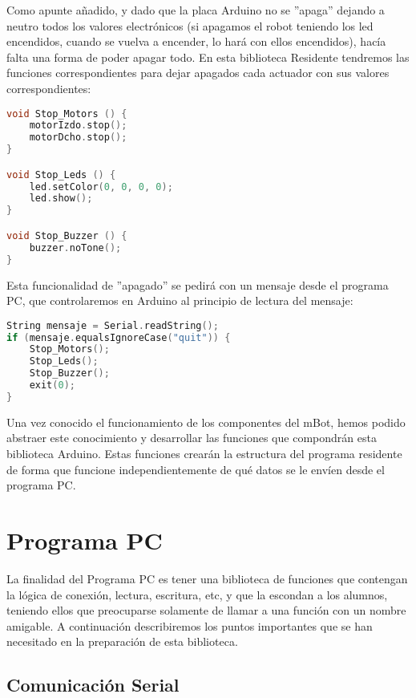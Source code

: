 \par Como apunte añadido, y dado que la placa Arduino no se ''apaga'' dejando a neutro todos los valores electrónicos (si apagamos el robot teniendo los led encendidos, cuando se vuelva a encender, lo hará con ellos encendidos), hacía falta una forma de poder apagar todo. En esta biblioteca Residente tendremos las funciones correspondientes para dejar apagados cada actuador con sus valores correspondientes:

\begin{lstlisting}[language=C,caption={Apagado de los actuadores},captionpos=b]
void Stop_Motors () {
	motorIzdo.stop();
	motorDcho.stop();
}

void Stop_Leds () {
	led.setColor(0, 0, 0, 0);
	led.show();
}

void Stop_Buzzer () {
	buzzer.noTone();
}	
\end{lstlisting}

Esta funcionalidad de ''apagado'' se pedirá con un mensaje desde el programa PC, que controlaremos en Arduino al principio de lectura del mensaje:

\begin{lstlisting}[language=C,caption={Apagado de los actuadores},captionpos=b]
String mensaje = Serial.readString();
if (mensaje.equalsIgnoreCase("quit")) {
	Stop_Motors();
	Stop_Leds();
	Stop_Buzzer();
	exit(0);
}
\end{lstlisting}

Una vez conocido el funcionamiento de los componentes del mBot, hemos podido abstraer este conocimiento y desarrollar las funciones que compondrán esta biblioteca Arduino. Estas funciones crearán la estructura del programa residente de forma que funcione independientemente de qué datos se le envíen desde el programa PC.

\section{Programa PC}\label{sec:pc}
La finalidad del Programa PC es tener una biblioteca de funciones que contengan la lógica de conexión, lectura, escritura, etc, y que la escondan a los alumnos, teniendo ellos que preocuparse solamente de llamar a una función con un nombre amigable. A continuación describiremos los puntos importantes que se han necesitado en la preparación de esta biblioteca.
\subsection{Comunicación Serial}\label{subssec:serialPython}

